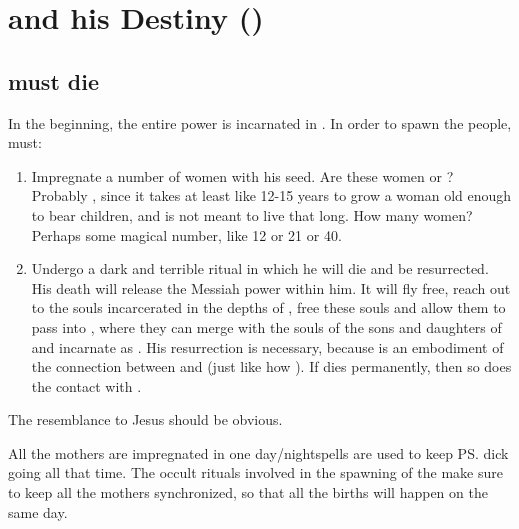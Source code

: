 \section{\Thanatzil{} and his Destiny ()}
\subsection{\Thanatzil{} must die}
In the beginning, the entire \resphan{} power is incarnated in \Thanatzil. 
In order to spawn the \resphan{} people, \Thanatzil must:

\begin{enumerate}
  \item
    Impregnate a number of women with his seed. 
    \subitem
      Are these women \nephilim{} or \humans{}? 
      Probably \nephilim, since it takes at least like 12-15 years to grow a \human{} woman old enough to bear children, and \Thanatzil{} is not meant to live that long.
    \subitem
      How many women? 
      Perhaps some magical number, like 12 or 21 or 40.
  \item 
    Undergo a dark and terrible ritual in which he will die and be resurrected. 
    \subitem
      His death will release the Messiah power within him. 
      It will fly free, reach out to the \bane{} souls incarcerated in the depths of \Nyx, free these souls and allow them to pass into \Miith{}, where they can merge with the souls of \nephilim{}\dash the sons and daughters of \Thanatzil \dash and incarnate as \resphain. 
    \subitem
      His resurrection is necessary, because \Thanatzil{} is an embodiment of the connection between \Miith{} and \Nyx{} (just like how ). 
      If \Thanatzil{} dies permanently, then so does the contact with \Daggerrain. 
\end{enumerate}

The resemblance to Jesus should be obvious. 

All the mothers are impregnated in one day/night\dash spells are used to keep \ps{\Thanatzil}{} dick going all that time. 
The occult rituals involved in the spawning of the \resphain{} make sure to keep all the mothers synchronized, so that all the births will happen on the same day. 

